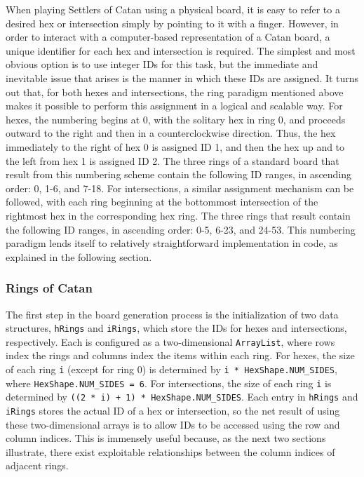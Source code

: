 \documentclass[pageno]{jpaper}
\begin{document}
\begin{doublespacing}
When playing Settlers of Catan using a physical board, it is easy to refer to a desired hex or intersection simply by pointing to it with a finger. However, in order to interact with a computer-based representation of a Catan board, a unique identifier for each hex and intersection is required. The simplest and most obvious option is to use integer IDs for this task, but the immediate and inevitable issue that arises is the manner in which these IDs are assigned. It turns out that, for both hexes and intersections, the ring paradigm mentioned above makes it possible to perform this assignment in a logical and scalable way. For hexes, the numbering begins at 0, with the solitary hex in ring 0, and proceeds outward to the right and then in a counterclockwise direction. Thus, the hex immediately to the right of hex 0 is assigned ID 1, and then the hex up and to the left from hex 1 is assigned ID 2. The three rings of a standard board that result from this numbering scheme contain the following ID ranges, in ascending order: 0, 1-6, and 7-18. For intersections, a similar assignment mechanism can be followed, with each ring beginning at the bottommost intersection of the rightmost hex in the corresponding hex ring. The three rings that result contain the following ID ranges, in ascending order: 0-5, 6-23, and 24-53. This numbering paradigm lends itself to relatively straightforward implementation in code, as explained in the following section.

\hypertarget{sec:rings_of_catan}{}
\subsubsection{Rings of Catan}

The first step in the board generation process is the initialization of two data structures, \lstinline$hRings$ and \lstinline$iRings$, which store the IDs for hexes and intersections, respectively. Each is configured as a two-dimensional \lstinline$ArrayList$, where rows index the rings and columns index the items within each ring. For hexes, the size of each ring \lstinline$i$ (except for ring 0) is determined by \lstinline$i * HexShape.NUM_SIDES$, where \lstinline$HexShape.NUM_SIDES = 6$. For intersections, the size of each ring \lstinline$i$ is determined by \lstinline$((2 * i) + 1) * HexShape.NUM_SIDES$. Each entry in \lstinline$hRings$ and \lstinline$iRings$ stores the actual ID of a hex or intersection, so the net result of using these two-dimensional arrays is to allow IDs to be accessed using the row and column indices. This is immensely useful because, as the next two sections illustrate, there exist exploitable relationships between the column indices of adjacent rings.


\end{doublespacing}
\end{document}

